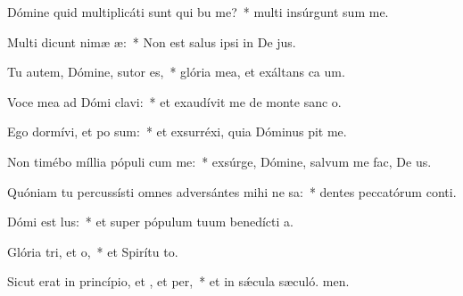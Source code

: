 \item Dómine quid multiplicáti sunt qui bu me?~* multi insúrgunt sum me.
\item Multi dicunt nimæ æ:~* Non est salus ipsi in De jus.
\item Tu autem, Dómine, sutor  es,~* glória mea, et exáltans ca um.
\item Voce mea ad Dómi clavi:~* et exaudívit me de monte sanc o.
\item Ego dormívi, et po sum:~* et exsurréxi, quia Dóminus pit me.
\item Non timébo míllia pópuli cum me:~* exsúrge, Dómine, salvum me fac, De us.
\item Quóniam tu percussísti omnes adversántes mihi ne sa:~* dentes peccatórum conti.
\item Dómi est lus:~* et super pópulum tuum benedícti a.
\item Glória tri, et o,~* et Spirítu to.
\item Sicut erat in princípio, et , et per,~* et in sǽcula sæculó. men.
